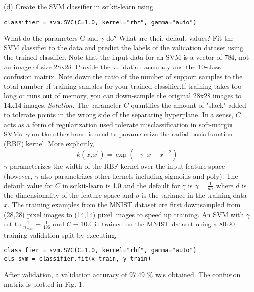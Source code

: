 \documentclass[12pt]{article}
\begin{document}
(d) Create the SVM classifier in scikit-learn using 

\begin{lstlisting}
classifier = svm.SVC(C=1.0, kernel="rbf", gamma="auto")
\end{lstlisting}
What do the parameters C and $\gamma$ do? What are their default values? Fit the SVM classifier to the data and predict the labels of the validation dataset using the trained classifier. Note that the input
data for an SVM is a vector of 784, not an image of size 28x28. Provide the validation accuracy
and the 10-class confusion matrix. Note down the ratio of the number of support samples to the
total number of training samples for your trained classifier.If training takes too long or runs out
of memory, you can down-sample the original 28x28 images to 14x14 images. \newline   \newline  
 \emph{Solution:} 
 The parameter $C$ quantifies the amount of "slack" added to tolerate points in the wrong side of the separating hyperplane. In a sense, $C$ acts as a form of regularization used tolerate misclassification in soft-margin SVMs. $\gamma$ on the other hand is used to parameterize the radial basis function (RBF) kernel. More explicitly, 
 $$ k(x, x^{\prime})   = \exp(-\gamma ||x -  x^{\prime} ||^{2}) $$  
$\gamma$ parameterizes the width of the RBF kernel over the input feature space (however, $\gamma$ also parametrizes other kernels including sigmoids and poly). The default value for $C$ in scikit-learn is 1.0 and the default for $\gamma$ is $\gamma = \frac{1}{d\sigma}$ where $d$ is the dimensionality of the feature space and $\sigma$ is the variance in the training data $x$. The training examples from the MNIST dataset are first downsampled from (28,28) pixel images to (14,14) pixel images to speed up training. An SVM with  $\gamma$ set to $\frac{1}{n_{feat}} = \frac{1}{196} $ and $C=10.0$  is trained on the MNIST dataset using a 80:20 training validation split by executing,  
\begin{lstlisting}
classifier = svm.SVC(C=1.0, kernel="rbf", gamma="auto")  
cls_svm = classifier.fit(x_train, y_train) 
\end{lstlisting}
After validation, a validation accuracy of 97.49 $\%$  was obtained. The confusion matrix is plotted in Fig. 1. \newline \newline
  
\end{document}
